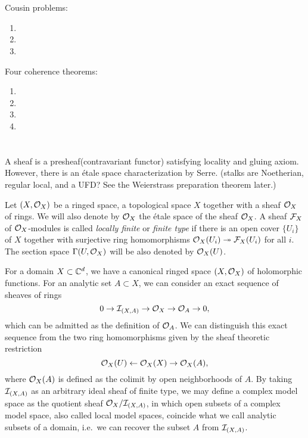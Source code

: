 \documentclass{../../large}
\begin{document}
\section{}
Cousin problems:
\begin{enumerate}
\item 
\item
\item
\end{enumerate}

Four coherence theorems:
\begin{enumerate}
\item 
\item
\item
\item
\end{enumerate}


\section{}

\begin{prb}
A sheaf is a presheaf(contravariant functor) satisfying locality and gluing axiom.
However, there is an \'etale space characterization by Serre.
(stalks are Noetherian, regular local, and a UFD?
See the Weierstrass preparation theorem later.)
\end{prb}

\begin{prb}
Let $(X,\mathcal{O}_X)$ be a ringed space, a topological space $X$ together with a sheaf $\mathcal{O}_X$ of rings.
We will also denote by $\mathcal{O}_X$ the \'etale space of the sheaf $\mathcal{O}_X$.
A sheaf $\mathcal{F}_X$ of $\mathcal{O}_X$-modules is called \emph{locally finite} or \emph{finite type} if there is an open cover $\{U_i\}$ of $X$ together with surjective ring homomorphisms $\mathcal{O}_X(U_i)\twoheadrightarrow\mathcal{F}_X(U_i)$ for all $i$.
The section space $\Gamma(U,\mathcal{O}_X)$ will be also denoted by $\mathcal{O}_X(U)$.
\end{prb}

\begin{prb}
For a domain $X\subset\mathbb{C}^d$, we have a canonical ringed space $(X,\mathcal{O}_X)$ of holomorphic functions.
For an analytic set $A\subset X$, we can consider an exact sequence of sheaves of rings
\[0\to\mathcal{I}_{(X,A)}\to\mathcal{O}_X\to\mathcal{O}_A\to0,\]
which can be admitted as the definition of $\mathcal{O}_A$.
We can distinguish this exact sequence from the two ring homomorphisms given by the sheaf theoretic restriction
\[\mathcal{O}_X(U)\leftarrow\mathcal{O}_X(X)\to\mathcal{O}_X(A),\]
where $\mathcal{O}_X(A)$ is defined as the colimit by open neighborhoods of $A$.
By taking $\mathcal{I}_{(X,A)}$ as an arbitrary ideal sheaf of finite type, we may define a complex model space as the quotient sheaf $\mathcal{O}_X/\mathcal{I}_{(X,A)}$, in which open subsets of a complex model space, also called local model spaces, coincide what we call analytic subsets of a domain, i.e.~we can recover the subset $A$ from $\mathcal{I}_{(X,A)}$.
\end{prb}
\end{document}
